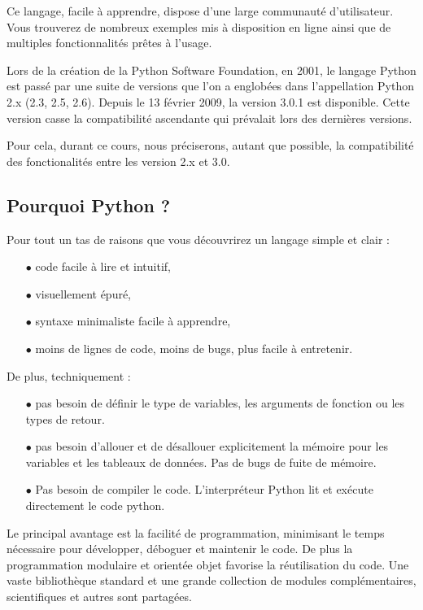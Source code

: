 Ce langage, facile \`a apprendre, dispose d'une large communaut\'e d'utilisateur.
Vous trouverez de nombreux exemples mis \`a disposition en ligne ainsi que de multiples
fonctionnalit\'es pr\^etes \`a l'usage.

Lors de la cr\'eation de la Python Software Foundation, en 2001, le langage Python est pass\'e par une suite de versions
que l'on a englob\'ees dans l'appellation Python 2.x (2.3, 2.5, 2.6).
Depuis le 13 f\'evrier 2009, la version 3.0.1 est disponible.
Cette version casse la compatibilit\'e ascendante qui pr\'evalait lors des derni\`eres versions.

Pour cela, durant ce cours, nous pr\'eciserons, autant que possible, la compatibilit\'e des fonctionalit\'es entre les version 2.x et 3.0.

\subsection{Pourquoi Python ? }

Pour tout un tas de raisons que vous découvrirez un langage simple et clair :
\begin{itemize}
\item[$\bullet$] code facile à lire et intuitif,
\item[$\bullet$] visuellement épuré,
\item[$\bullet$] syntaxe minimaliste facile à apprendre,
\item[$\bullet$] moins de lignes de code, moins de bugs, plus facile à entretenir.
\end{itemize}

De plus, techniquement :
\begin{itemize}
\item[$\bullet$] pas besoin de définir le type de variables, les arguments de
  fonction ou les types de retour.
\item[$\bullet$] pas besoin d’allouer et de désallouer
explicitement la mémoire pour les variables et les tableaux de données. Pas de
bugs de fuite de mémoire.
\item[$\bullet$] Pas besoin de compiler le code. L’interpréteur Python lit et
exécute directement le code python.
\end{itemize}

Le principal avantage est la facilité de programmation, minimisant le temps
nécessaire pour développer, déboguer et maintenir le code.
De plus la programmation modulaire et orientée objet favorise la réutilisation du code.
Une vaste bibliothèque standard et une grande collection de modules
complémentaires, scientifiques et autres sont partagées.

